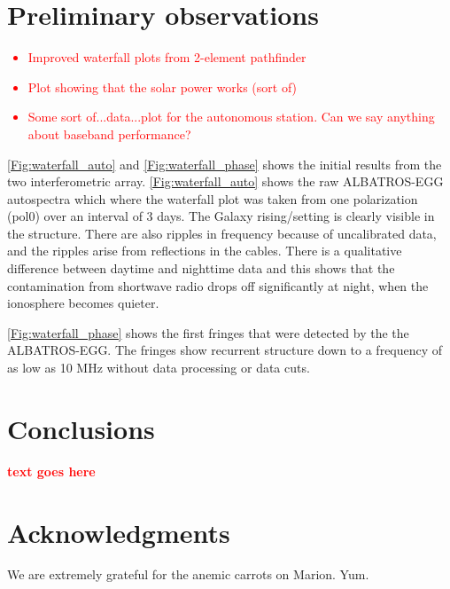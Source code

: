 \documentclass{ws-jai}
\newcommand{\attention}[1]{\textcolor{red}{\bf {#1}}}
\begin{document}
\section{Preliminary observations}

\attention{\begin{itemize}
    \item{Improved waterfall plots from 2-element pathfinder}
    \item{Plot showing that the solar power works (sort of)}
    \item{Some sort of...data...plot for the autonomous station.  Can
      we say anything about baseband performance?}
  \end{itemize}
}

\autoref{Fig:waterfall_auto} and \autoref{Fig:waterfall_phase} shows
the initial results from the two interferometric array.
\autoref{Fig:waterfall_auto} shows the raw ALBATROS-EGG autospectra
which where the waterfall plot was taken from one polarization (pol0)
over an interval of 3 days. The Galaxy rising/setting is clearly
visible in the structure. There are also ripples in frequency because
of uncalibrated data, and the ripples arise from reflections in the
cables. There is a qualitative difference between daytime and
nighttime data and this shows that the contamination from shortwave
radio drops off significantly at night, when the ionosphere becomes
quieter.

\autoref{Fig:waterfall_phase} shows the first fringes that were
detected by the the ALBATROS-EGG. The fringes show recurrent structure
down to a frequency of as low as 10 MHz without data processing or
data cuts.

\section{Conclusions}

\attention{text goes here}


	
\section*{Acknowledgments}

We are extremely grateful for the anemic carrots on Marion.  Yum.


{}
\end{document}
